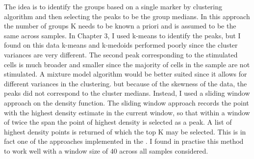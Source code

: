 The idea is to identify the groups based on a single marker by clustering algorithm and then selecting the peaks to be the group medians.
In this approach the number of groups K needs to be known a priori and is assumed to be the same across samples.
In Chapter 3, I used k-means to identify the peaks, but I found on this data k-means and k-medoids performed poorly since the cluster variances are very different.
The second peak corresponding to the stimulated cells is much broader and smaller since the majority of cells in the sample are not stimulated.
A mixture model algorithm would be better suited since it allows for different variances in the clustering.
but because of the skewness of the data, the peaks did not correspond to the cluster medians.
Instead, I used a sliding window approach on the density function.
The sliding window approach records the point with the highest density estimate in the current window,
so that within a window of twice the span the point of highest density is selected as a peak.
A list of highest density points is returned of which the top K may be selected.
This is in fact one of the approaches implemented in the .
I found in practise this method to work well with a window size of $40$ across all samples considered.

